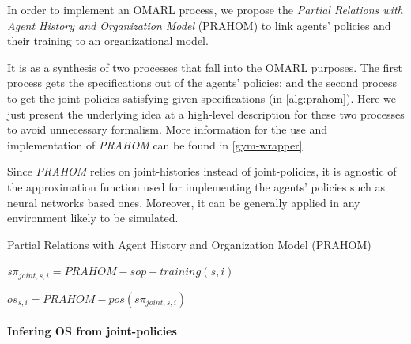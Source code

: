 \documentclass[runningheads]{llncs}
\begin{document}
In order to implement an OMARL process, we propose the \emph{Partial Relations with Agent History and Organization Model} (PRAHOM) to link agents' policies and their training to an organizational model.

It is as a synthesis of two processes that fall into the OMARL purposes. The first process gets the specifications out of the agents' policies; and the second process to get the joint-policies satisfying given specifications (in \autoref{alg:prahom}).
Here we just present the underlying idea at a high-level description for these two processes to avoid unnecessary formalism. More information for the use and implementation of \emph{PRAHOM} can be found in \autoref{gym-wrapper}.

Since \emph{PRAHOM} relies on joint-histories instead of joint-policies, it is agnostic of the approximation function used for implementing the agents' policies such as neural networks based ones. Moreover, it can be generally applied in any environment likely to be simulated.


\begin{algorithm}[hbt!]
    \caption{Partial Relations with Agent History and Organization Model (PRAHOM)}\label{alg:prahom}



    $s\pi_{joint,s,i} = PRAHOM-sop-training(s,i)$

    $os_{s,i} = PRAHOM-pos(s\pi_{joint,s,i})$

\end{algorithm}

\paragraph{\textbf{Infering OS from joint-policies}}
\end{document}
